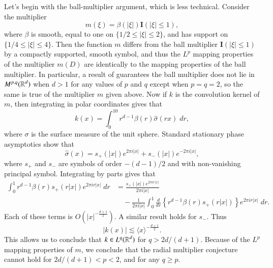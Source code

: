 Let's begin with the ball-multiplier argument, which is less technical. Consider the multiplier
%
\[ m(\xi) = \beta(|\xi|) \mathbf{I}(|\xi| \leq 1), \]
%
where $\beta$ is smooth, equal to one on $\{ 1/2 \leq |\xi| \leq 2 \}$, and has support on $\{ 1/4 \leq |\xi| \leq 4 \}$. Then the function $m$ differs from the ball multiplier $\mathbf{I}(|\xi| \leq 1)$ by a compactly supported, smooth symbol, and thus the $L^p$ mapping properties of the multiplier $m(D)$ are identically to the mapping properties of the ball multiplier. In particular, a result of \cite{Fefferman} guarantees the ball multiplier does not lie in $M^{p,q}(\operatorname{\mathbb{R}}^d)$ when $d > 1$ for any values of $p$ and $q$ except when $p = q = 2$, so the same is true of the multiplier $m$ given above. Now if $k$ is the convolution kernel of $m$, then integrating in polar coordinates gives that
%
\[ k(x) = \int_0^{10} r^{d-1} \beta(r) \widehat{\sigma}(r x)\; dr, \]
%
where $\sigma$ is the surface measure of the unit sphere. Standard stationary phase asymptotics show that
%
\[ \widehat{\sigma}(x) = s_+(|x|) e^{2 \pi i |x|} + s_-(|x|) e^{- 2 \pi i |x|}, \]
%
where $s_+$ and $s_-$ are symbols of order $-(d-1)/2$ and with non-vanishing principal symbol. Integrating by parts gives that
%
\begin{align*}
    \int_0^1 r^{d-1} \beta(r) s_+(r|x|) e^{2 \pi i r |x|}\; dr &= \frac{s_+(|x|) e^{2 \pi i r |x|}}{2 \pi i |x|}\\
    &\quad - \frac{1}{2 \pi i |x|} \int_0^1 \frac{d}{dr} \left\{ r^{d-1} \beta(r) s_+(r|x|) \right\} e^{2 \pi i r |x|}\; dr.
\end{align*}
%
Each of these terms is $O( |x|^{- \frac{d+1}{2}} )$. A similar result holds for $s_-$. Thus
%
\[ |k(x)| \lesssim \langle x \rangle^{- \frac{d+1}{2}}. \]
%
This allows us to conclude that $k \in L^q(\operatorname{\mathbb{R}}^d)$ for $q > 2d/(d+1)$. Because of the $L^p$ mapping properties of $m$, we conclude that the radial multiplier conjecture cannot hold for $2d/(d+1) < p < 2$, and for any $q \geq p$.

